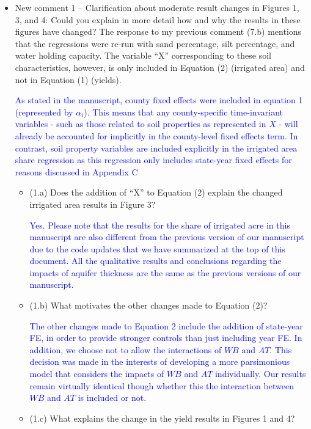 \documentclass[
]{article}
\begin{document}
\begin{itemize}
\item New comment 1 – Clarification about moderate result changes in Figures 1, 3, and 4: Could you explain in more detail how and why the results in these figures have changed? The response to my previous comment (7.b) mentions that the regressions were re-run with sand percentage, silt percentage, and water holding capacity. The variable ``X'' corresponding to these soil characteristics, however, is only included in Equation (2) (irrigated area) and not in Equation (1) (yields).

  \textcolor{blue}{As stated in the manuscript, county fixed effects were included in equation 1 (represented by $\alpha_i$). This means that any county-specific time-invariant variables - such as those related to soil properties as represented in $X$ - will already be accounted for implicitly in the county-level fixed effects term. In contrast, soil property variables are included explicitly in the irrigated area share regression as this regression only includes state-year fixed effects for reasons discussed in Appendix C}

  \begin{itemize}
  \item (1.a) Does the addition of ``X'' to Equation (2) explain the changed irrigated area results in Figure 3?

  \textcolor{blue}{Yes. Please note that the results for the share of irrigated acre in this manuscript are also different from the previous version of our manuscript  due to the code updates that we have summarized at the top of this document. All the qualitative results and conclusions regarding the impacts of aquifer thickness are the same as the previous versions of our manuscript.}
  
  \item (1.b) What motivates the other changes made to Equation (2)?

  \textcolor{blue}{The other changes made to Equation 2 include the addition of state-year FE, in order to provide stronger controls than just including year FE. In addition, we choose not to allow the interactions of $WB$ and $AT$. This decision was made in the interests of developing a more parsimonious model that considers the impacts of $WB$ and $AT$ individually. Our results remain virtually identical though whether this the interaction between $WB$ and $AT$ is included or not. }
  
  \item (1.c) What explains the change in the yield results in Figures 1 and 4?


\end{itemize}
\end{itemize}
\end{document}

